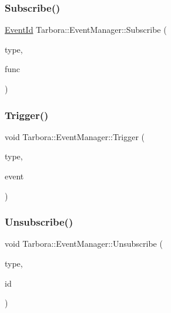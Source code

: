 \subsubsection{\texorpdfstring{Subscribe()}{Subscribe()}}
{\footnotesize\ttfamily \hyperlink{namespaceTarbora_a5373bb1f8a65622379828cdefc8d42e5}{Event\+Id} Tarbora\+::\+Event\+Manager\+::\+Subscribe (\begin{DoxyParamCaption}\item[{\hyperlink{namespaceTarbora_a70bd9c4d542b943fff3793f78189967e}{Event\+Type}}]{type,  }\item[{\hyperlink{namespaceTarbora_a418b0f026f0664511b2a0c4129edc11f}{Event\+Fn}}]{func }\end{DoxyParamCaption})}

\mbox{\label{namespaceTarbora_1_1EventManager_a9ac99b33a5dd3509625ac20520d722ab}} 
\subsubsection{\texorpdfstring{Trigger()}{Trigger()}}
{\footnotesize\ttfamily void Tarbora\+::\+Event\+Manager\+::\+Trigger (\begin{DoxyParamCaption}\item[{\hyperlink{namespaceTarbora_a70bd9c4d542b943fff3793f78189967e}{Event\+Type}}]{type,  }\item[{\hyperlink{structTarbora_1_1Event}{Event} $\ast$}]{event }\end{DoxyParamCaption})}

\mbox{\label{namespaceTarbora_1_1EventManager_ab1d0fc452783db5cfb1b5d962f408482}} 
\subsubsection{\texorpdfstring{Unsubscribe()}{Unsubscribe()}}
{\footnotesize\ttfamily void Tarbora\+::\+Event\+Manager\+::\+Unsubscribe (\begin{DoxyParamCaption}\item[{\hyperlink{namespaceTarbora_a70bd9c4d542b943fff3793f78189967e}{Event\+Type}}]{type,  }\item[{\hyperlink{namespaceTarbora_a5373bb1f8a65622379828cdefc8d42e5}{Event\+Id}}]{id }\end{DoxyParamCaption})}



